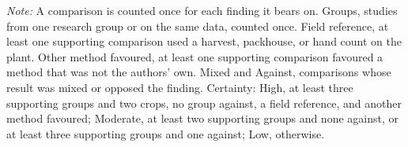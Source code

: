 \begin{table}[!t]
\smallskip
\parbox{\textwidth}{\textit{Note:} A comparison is counted once for each finding it bears on. Groups, studies from one research group or on the same data, counted once. Field reference, at least one supporting comparison used a harvest, packhouse, or hand count on the plant. Other method favoured, at least one supporting comparison favoured a method that was not the authors' own. Mixed and Against, comparisons whose result was mixed or opposed the finding. Certainty: High, at least three supporting groups and two crops, no group against, a field reference, and another method favoured; Moderate, at least two supporting groups and none against, or at least three supporting groups and one against; Low, otherwise.}
\end{table}
